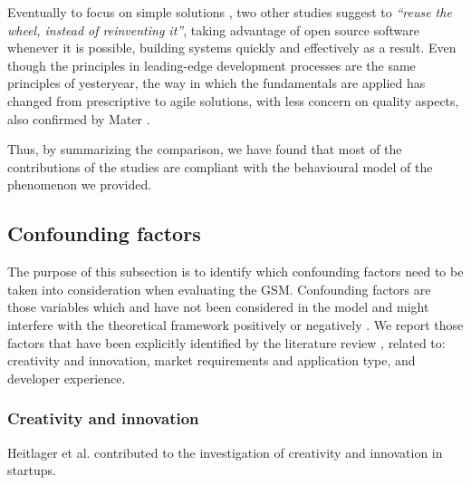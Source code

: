 \documentclass[10pt,journal,letterpaper,compsoc]{IEEEtran}
\begin{document}
Eventually to focus on simple solutions %
, two other studies \cite{Wall2001, Bean2005} suggest to \textit{``reuse the 
wheel, instead of reinventing it''}, taking advantage of open source software 
whenever it is possible, building systems quickly and effectively as a result. 
Even though the principles in leading-edge development processes are the same 
principles of yesteryear, the way in which the fundamentals are applied has 
changed from prescriptive to agile solutions, with less concern on quality 
aspects, also confirmed by Mater \cite{Mater2000}.


Thus, by summarizing the comparison, we have found that most of the 
contributions of the studies are compliant with the behavioural model of the 
phenomenon we provided.

\subsection{Confounding factors}
\label{sect:an:comp:cat-vs-literature:conf}

The purpose of this subsection is to identify which confounding factors need to 
be taken into consideration when evaluating the GSM. Confounding factors are 
those variables which and have not been considered in the model and might 
interfere with the theoretical framework positively or negatively 
\cite{ColinRobson2009}. We report those factors that have been explicitly 
identified by the literature review %
, related to: creativity and innovation, market requirements and application 
type, and developer experience.

\subsubsection{Creativity and innovation} 
Heitlager et al. \cite{Heitlager2007} contributed to the investigation of 
creativity and innovation in startups. 
\end{document}
